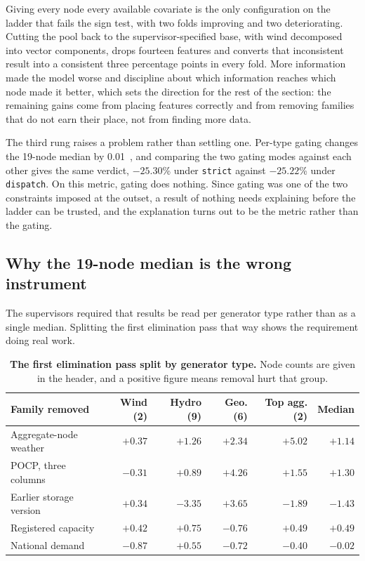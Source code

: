 Giving every node every available covariate is the only configuration on the ladder that
fails the sign test, with two folds improving and two deteriorating. Cutting the pool back
to the supervisor-specified base, with wind decomposed into vector components, drops
fourteen features and converts that inconsistent result into a consistent three percentage
points in every fold. More information made the model worse and discipline about which
information reaches which node made it better, which sets the direction for the rest of the
section: the remaining gains come from placing features correctly and from removing families
that do not earn their place, not from finding more data.

The third rung raises a problem rather than settling one. Per-type gating changes the
19-node median by 0.01~\pp{}, and comparing the two gating modes against each other gives
the same verdict, $-25.30$\% under \verb+strict+ against $-25.22$\% under \verb+dispatch+.
On this metric, gating does nothing. Since gating was one of the two constraints imposed at
the outset, a result of nothing needs explaining before the ladder can be trusted, and the
explanation turns out to be the metric rather than the gating.

\subsection{Why the 19-node median is the wrong instrument}
\label{sec:res-cov-cat}

The supervisors required that results be read per generator type rather than as a single
median. Splitting the first elimination pass that way shows the requirement doing real
work.

\begin{table}[htp]
\centering
\begin{tabular}{lrrrrr}
\toprule
{\bf Family removed} & {\bf Wind (2)} & {\bf Hydro (9)} & {\bf Geo. (6)} & {\bf Top agg. (2)} & {\bf Median} \\
\midrule
Aggregate-node weather & $+0.37$ & $+1.26$ & $+2.34$ & $+5.02$ & $+1.14$ \\
POCP, three columns & $-0.31$ & $+0.89$ & $+4.26$ & $+1.55$ & $+1.30$ \\
Earlier storage version & $+0.34$ & $-3.35$ & $+3.65$ & $-1.89$ & $-1.43$ \\
Registered capacity & $+0.42$ & $+0.75$ & $-0.76$ & $+0.49$ & $+0.49$ \\
National demand & $-0.87$ & $+0.55$ & $-0.72$ & $-0.40$ & $-0.02$ \\
\bottomrule
\end{tabular}
\caption[Elimination by generator category]{\textbf{The first elimination pass split by
generator type.} Node counts are given in the header, and a positive figure means removal
hurt that group.}
\label{tab:bycat}
\end{table}

